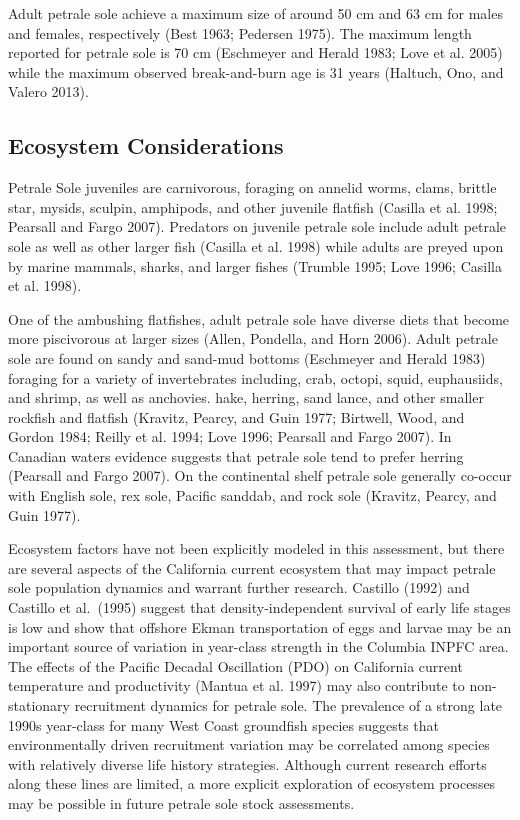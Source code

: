 \documentclass[11pt,
  english,
  letterpaper,
]{article}
\begin{document}
Adult petrale sole achieve a maximum size of around 50 cm and 63 cm for males and females, respectively (Best 1963; Pedersen 1975). The maximum length reported for petrale sole is 70 cm (Eschmeyer and Herald 1983; Love et al. 2005) while the maximum observed break-and-burn age is 31 years (Haltuch, Ono, and Valero 2013).

\hypertarget{ecosystem-considerations-1}{%
\subsection{Ecosystem Considerations}\label{ecosystem-considerations-1}}

Petrale Sole juveniles are carnivorous, foraging on annelid worms, clams, brittle star, mysids, sculpin, amphipods, and other juvenile flatfish (Casilla et al. 1998; Pearsall and Fargo 2007). Predators on juvenile petrale sole include adult petrale sole as well as other larger fish (Casilla et al. 1998) while adults are preyed upon by marine mammals, sharks, and larger fishes (Trumble 1995; Love 1996; Casilla et al. 1998).

One of the ambushing flatfishes, adult petrale sole have diverse diets that become more piscivorous at larger sizes (Allen, Pondella, and Horn 2006). Adult petrale sole are found on sandy and sand-mud bottoms (Eschmeyer and Herald 1983) foraging for a variety of invertebrates including, crab, octopi, squid, euphausiids, and shrimp, as well as anchovies. hake, herring, sand lance, and other smaller rockfish and flatfish (Kravitz, Pearcy, and Guin 1977; Birtwell, Wood, and Gordon 1984; Reilly et al. 1994; Love 1996; Pearsall and Fargo 2007). In Canadian waters evidence suggests that petrale sole tend to prefer herring (Pearsall and Fargo 2007). On the continental shelf petrale sole generally co-occur with English sole, rex sole, Pacific sanddab, and rock sole (Kravitz, Pearcy, and Guin 1977).

Ecosystem factors have not been explicitly modeled in this assessment, but there are several aspects of the California current ecosystem that may impact petrale sole population dynamics and warrant further research. Castillo (1992) and Castillo et al.~(1995) suggest that density-independent survival of early life stages is low and show that offshore Ekman transportation of eggs and larvae may be an important source of variation in year-class strength in the Columbia INPFC area. The effects of the Pacific Decadal Oscillation (PDO) on California current temperature and productivity (Mantua et al. 1997) may also contribute to non-stationary recruitment dynamics for petrale sole. The prevalence of a strong late 1990s year-class for many West Coast groundfish species suggests that environmentally driven recruitment variation may be correlated among species with relatively diverse life history strategies. Although current research efforts along these lines are limited, a more explicit exploration of ecosystem processes may be possible in future petrale sole stock assessments.
\end{document}
